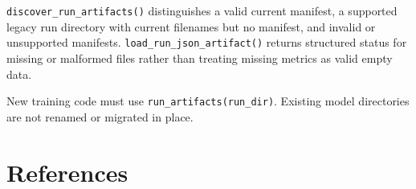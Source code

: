 \documentclass[
]{article}
\begin{document}
\texttt{discover\_run\_artifacts()} distinguishes a valid current
manifest, a supported legacy run directory with current filenames but no
manifest, and invalid or unsupported manifests.
\texttt{load\_run\_json\_artifact()} returns structured status for
missing or malformed files rather than treating missing metrics as valid
empty data.

New training code must use \texttt{run\_artifacts(run\_dir)}. Existing
model directories are not renamed or migrated in place.

\hypertarget{references}{%
\section*{References}\label{references}}

\hypertarget{refs}{}
\end{document}
